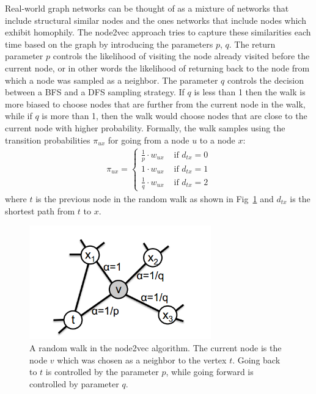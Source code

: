 Real-world graph networks can be thought of as a mixture of networks that
include structural similar nodes and the ones networks that include nodes which
exhibit homophily. The node2vec approach tries to capture these similarities each
time based on the graph by introducing the parameters $p$, $q$. The return parameter $p$ controls the
likelihood of visiting the node already visited before the current node, or in
other words the likelihood of returning back to the node from which a node was
sampled as a neighbor. The parameter $q$ controls the decision between a BFS and
a DFS sampling strategy. If $q$ is less than 1 then the walk is more biased
to choose nodes that are further from the current node in the walk, while if $q$
is more than 1, then the walk would choose nodes that are close to the current
node with higher probability. Formally, the walk samples using the transition
probabilities $\pi_{ux}$ for going from a node $u$ to a node $x$:
\begin{align}
\pi_{ux} = \begin{cases} \frac{1}{p}\cdot w_{ux} & \text{ if } d_{tx} = 0 \\
1\cdot w_{ux} & \text{ if } d_{tx} = 1 \\
\frac{1}{q}\cdot w_{ux} & \text{ if } d_{tx} = 2
\end{cases}
\end{align}
where $t$ is the previous node in the random walk as shown in
Fig~\ref{node2vec_png} and $d_{tx}$ is the shortest path from $t$ to $x$.
\begin{figure}
\begin{center}
\includegraphics[width=0.7\textwidth]{figures/node2vec.png}
\end{center}
\label{node2vec_png}
\caption{A random walk in the node2vec algorithm. The current node is the node
$v$ which was chosen as a neighbor to the vertex $t$.
Going back to $t$ is controlled by the parameter $p$, while going forward is
controlled by parameter $q$.}
\end{figure}

